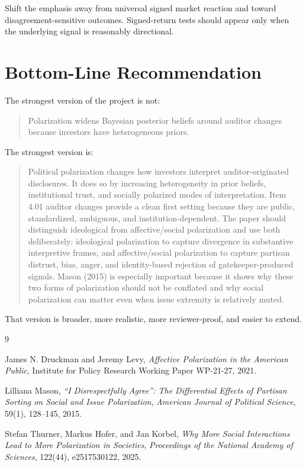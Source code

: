 \documentclass[12pt]{article}
\begin{document}
Shift the emphasis away from universal signed market reaction and toward disagreement-sensitive outcomes. Signed-return tests should appear only when the underlying signal is reasonably directional.

\section{Bottom-Line Recommendation}

The strongest version of the project is not:

\begin{quote}
Polarization widens Bayesian posterior beliefs around auditor changes because investors have heterogeneous priors.
\end{quote}

The strongest version is:

\begin{quote}
Political polarization changes how investors interpret auditor-originated disclosures. It does so by increasing heterogeneity in prior beliefs, institutional trust, and socially polarized modes of interpretation. Item 4.01 auditor changes provide a clean first setting because they are public, standardized, ambiguous, and institution-dependent. The paper should distinguish ideological from affective/social polarization and use both deliberately: ideological polarization to capture divergence in substantive interpretive frames, and affective/social polarization to capture partisan distrust, bias, anger, and identity-based rejection of gatekeeper-produced signals. Mason (2015) is especially important because it shows why these two forms of polarization should not be conflated and why social polarization can matter even when issue extremity is relatively muted.
\end{quote}

That version is broader, more realistic, more reviewer-proof, and easier to extend.

\begin{thebibliography}{9}

James N. Druckman and Jeremy Levy,
\textit{Affective Polarization in the American Public},
Institute for Policy Research Working Paper WP-21-27, 2021.

Lilliana Mason,
\textit{``I Disrespectfully Agree'': The Differential Effects of Partisan Sorting on Social and Issue Polarization},
\textit{American Journal of Political Science}, 59(1), 128--145, 2015.

Stefan Thurner, Markus Hofer, and Jan Korbel,
\textit{Why More Social Interactions Lead to More Polarization in Societies},
\textit{Proceedings of the National Academy of Sciences}, 122(44), e2517530122, 2025.

\end{thebibliography}
\end{document}
